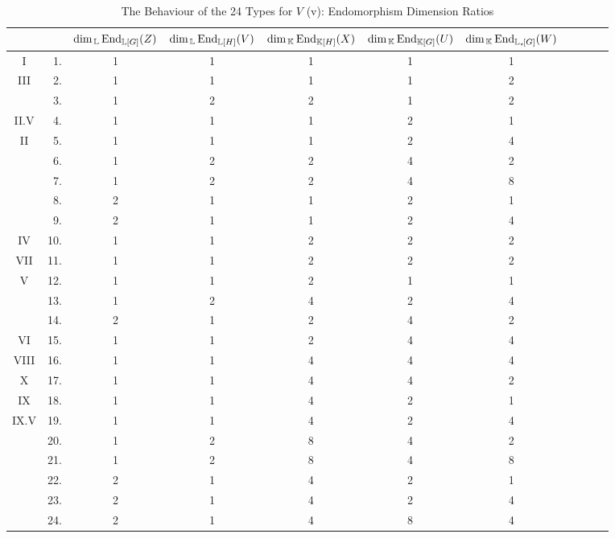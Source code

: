\begin{table}[p] %
    \vspace{4cm}
\centering
\bgroup
\caption{The Behaviour of the 24 Types for $V$ (v): Endomorphism Dimension Ratios}
\label{tab:24types6}
\def\arraystretch{1.1}
\begin{tabular}{c r c c c c c c c c c}
    \toprule
    &  & $\dim_{\, {\mathbb L}}\operatorname{End}_{{\mathbb L}[G]}(Z)$ & $\dim_{\, {\mathbb L}}\operatorname{End}_{{\mathbb L}[H]}(V)$ & $\dim_{\, {\mathbb K}}\operatorname{End}_{{\mathbb K}[H]}(X)$ & $\dim_{\, {\mathbb K}}\operatorname{End}_{{\mathbb K}[G]}(U)$ & $\dim_{\, {\mathbb K}}\operatorname{End}_{{\mathbb L}_{\star \hspace{-0.1em}}[G]}(W)$ \\
    \midrule
I & 1.  & 1 & 1 & 1 & 1 & 1 \\ 
III & 2.  & 1 & 1 & 1 & 1 & 2 \\ 
& 3.  & 1 & 2 & 2 & 1 & 2 \\ 
II.V & 4.  & 1 & 1 & 1 & 2 & 1 \\ 
II & 5.  & 1 & 1 & 1 & 2 & 4 \\ 
& 6.  & 1 & 2 & 2 & 4 & 2 \\ 
& 7.  & 1 & 2 & 2 & 4 & 8 \\ 
& 8.  & 2 & 1 & 1 & 2 & 1 \\ 
& 9.  & 2 & 1 & 1 & 2 & 4 \\ 
IV & 10. & 1 & 1 & 2 & 2 & 2 \\ 
VII & 11. & 1 & 1 & 2 & 2 & 2 \\ 
V & 12. & 1 & 1 & 2 & 1 & 1 \\ 
& 13. & 1 & 2 & 4 & 2 & 4 \\ 
& 14. & 2 & 1 & 2 & 4 & 2 \\ 
VI & 15. & 1 & 1 & 2 & 4 & 4 \\ 
VIII & 16. & 1 & 1 & 4 & 4 & 4 \\ 
X & 17. & 1 & 1 & 4 & 4 & 2 \\ 
IX & 18. & 1 & 1 & 4 & 2 & 1 \\ 
IX.V & 19. & 1 & 1 & 4 & 2 & 4 \\ 
& 20. & 1 & 2 & 8 & 4 & 2 \\ 
& 21. & 1 & 2 & 8 & 4 & 8 \\ 
& 22. & 2 & 1 & 4 & 2 & 1 \\ 
& 23. & 2 & 1 & 4 & 2 & 4 \\ 
& 24. & 2 & 1 & 4 & 8 & 4 \\
\bottomrule
\end{tabular}
\egroup
\end{table}

